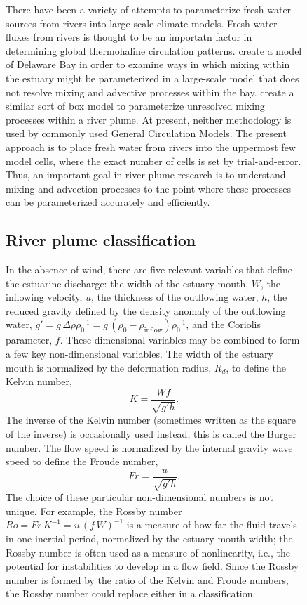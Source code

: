 \documentclass[11pt]{report}
\numberwithin{equation}{section}
\begin{document}
\begin{figure}
There have been a variety of attempts to parameterize fresh water sources from rivers into large-scale climate models.  Fresh water fluxes from rivers is thought to be an importatn factor in determining global thermohaline circulation patterns.  \citet{garvine.whitney:06} create a model of Delaware Bay in order to examine ways in which mixing within the estuary might be parameterized in a large-scale model that does not resolve mixing and advective processes within the bay.   \citet{hordoir.ea:08} create a similar sort of box model to parameterize unresolved mixing processes within a river plume.  At present, neither methodology is used by commonly used General Circulation Models.  The present approach is to place fresh water from rivers into the uppermost few model cells, where the exact number of cells is set by trial-and-error.  Thus, an important goal in river plume research is to understand mixing and advection processes to the point where these processes can be parameterized accurately and efficiently.

\subsection{River plume classification}

In the absence of wind, there are five relevant variables that define the estuarine discharge:  the width of the estuary mouth, $W$, the inflowing velocity, $u$, the thickness of the outflowing water, $h$, the reduced gravity defined by the density anomaly of the outflowing water, $g' = g\,\Delta\rho \rho_0^{-1} = g\,(\rho_0-\rho_{\mathrm{inflow}}) \rho_0^{-1}$, and the Coriolis parameter, $f$.  These dimensional variables may be combined to form a few key non-dimensional variables.  The width of the estuary mouth is normalized by the deformation radius, $R_d$, to define the Kelvin number,
\begin{equation}
    K = \frac{W f}{\sqrt{g' h}}.
\end{equation}
The inverse of the Kelvin number (sometimes written as the square of the inverse) is occasionally used instead, this is called the Burger number.  The flow speed is normalized by the internal gravity wave speed to define the Froude number,
\begin{equation}
    Fr = \frac{u}{\sqrt{g' h}}.
\end{equation}
The choice of these particular non-dimensional numbers is not unique.  For example, the Rossby number $Ro=Fr\,K^{-1}=u\,(f\,W)^{-1}$ is a measure of how far the fluid travels in one inertial period, normalized by the estuary mouth width; the Rossby number is often used as a measure of nonlinearity, i.e., the potential for instabilities to develop in a flow field.  Since the Rossby number is formed by the ratio of the Kelvin and Froude numbers, the Rossby number could replace either in a classification.


\end{figure}
\end{document}
